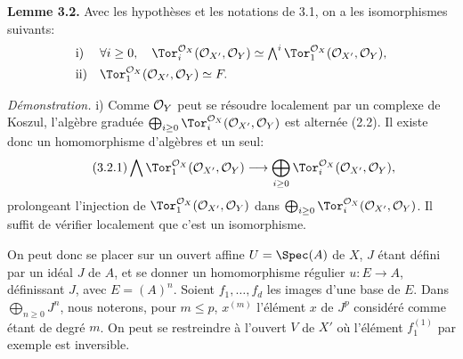 \textbf{Lemme 3.2.} Avec les hypothèses et les notations de 3.1, on a les isomorphismes suivants:
\[
\begin{array}{ll}
\text{i)}&
\forall i\ge0,\quad
\Tor_i^{\cO_X}(\cO_{X'},\cO_Y)
\simeq
\bigwedge^i\Tor_1^{\cO_X}(\cO_{X'},\cO_Y),\\[4pt]
\text{ii)}&
\Tor_1^{\cO_X}(\cO_{X'},\cO_Y)\simeq F.
\end{array}
\]

\textit{Démonstration.}
i)
Comme \(\mathcal O_Y\) peut se résoudre localement par un complexe de Koszul, l'algèbre graduée \(\bigoplus_{i\ge0}\Tor_i^{\cO_X}(\cO_{X'},\cO_Y)\) est alternée (2.2). Il existe donc un homomorphisme d'algèbres et un seul:
\begin{equation}\tag{3.2.1}
\bigwedge \Tor_1^{\cO_X}(\cO_{X'},\cO_Y)
\longrightarrow
\bigoplus_{i\ge0}\Tor_i^{\cO_X}(\cO_{X'},\cO_Y),
\end{equation}
prolongeant l'injection de \(\Tor_1^{\cO_X}(\cO_{X'},\cO_Y)\) dans
\(\bigoplus_{i\ge0}\Tor_i^{\cO_X}(\cO_{X'},\cO_Y)\). Il suffit de vérifier localement que c'est un isomorphisme.

On peut donc se placer sur un ouvert affine \(U=\Spec(A)\) de \(X\), \(J\) étant défini par un idéal \(J\) de \(A\), et se donner un homomorphisme régulier \(u:E\to A\), définissant \(J\), avec \(E=(A)^n\). Soient \(f_1,\ldots,f_d\) les images d'une base de \(E\). Dans \(\bigoplus_{n\ge0}J^n\), nous noterons, pour \(m\le p\), \(x^{(m)}\) l'élément \(x\) de \(J^p\) considéré comme étant de degré \(m\). On peut se restreindre à l'ouvert \(V\) de \(X'\) où l'élément \(f_1^{(1)}\) par exemple est inversible.

